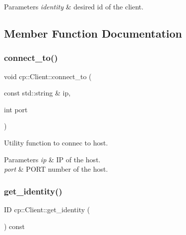 \begin{DoxyParams}{Parameters}
{\em identity} & desired id of the client. \\
\hline
\end{DoxyParams}


\subsection{Member Function Documentation}
\mbox{\label{classcp_1_1_client_a6da5c65dc07b98f84b221c3a80e23c96}} 
\subsubsection{\texorpdfstring{connect\+\_\+to()}{connect\_to()}}
{\footnotesize\ttfamily void cp\+::\+Client\+::connect\+\_\+to (\begin{DoxyParamCaption}\item[{const std\+::string \&}]{ip,  }\item[{int}]{port }\end{DoxyParamCaption})\hspace{0.3cm}{\ttfamily [inline]}}



Utility function to connec to host. 


\begin{DoxyParams}{Parameters}
{\em ip} & IP of the host. \\
\hline
{\em port} & P\+O\+RT number of the host. \\
\hline
\end{DoxyParams}
\mbox{\label{classcp_1_1_client_af18deba2fb9aff79c9221ab4d89f4120}} 
\subsubsection{\texorpdfstring{get\+\_\+identity()}{get\_identity()}}
{\footnotesize\ttfamily ID cp\+::\+Client\+::get\+\_\+identity (\begin{DoxyParamCaption}{ }\end{DoxyParamCaption}) const\hspace{0.3cm}{\ttfamily [inline]}}



